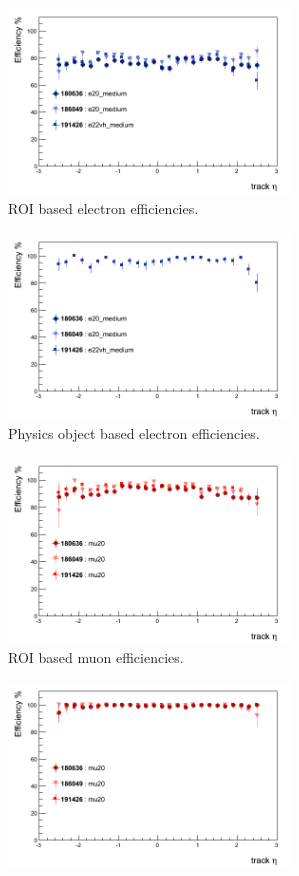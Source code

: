 \clearpage

\begin{figure}[htbp]
	\begin{subfigure}{.5\linewidth}
		\centering
		\includegraphics[width=75mm]{f/e20_medium_IDTrkNoCut_eta_IDS_eff}
		\caption{ROI based electron efficiencies.}
		\label{fig:trig_2011_L2_eta_a}
	\end{subfigure}
	\begin{subfigure}{.5\linewidth}	
		\centering
		\includegraphics[width=75mm]{f/e20_medium_IDTrkNoCut_eta_IDS_eff_comb}
		\caption{Physics object based electron efficiencies.}
		\label{fig:trig_2011_L2_eta_b}
	\end{subfigure}
	\begin{subfigure}{.5\linewidth}	
		\centering
		\includegraphics[width=75mm]{f/mu20_IDTrkNoCut_eta_IDS_eff}
		\caption{ROI based muon efficiencies.}
		\label{fig:trig_2011_L2_eta_c}
	\end{subfigure}
	\begin{subfigure}{.5\linewidth}	
		\centering
		\includegraphics[width=75mm]{f/mu20_IDTrkNoCut_eta_IDS_eff_comb}

\end{subfigure}
\end{figure}
